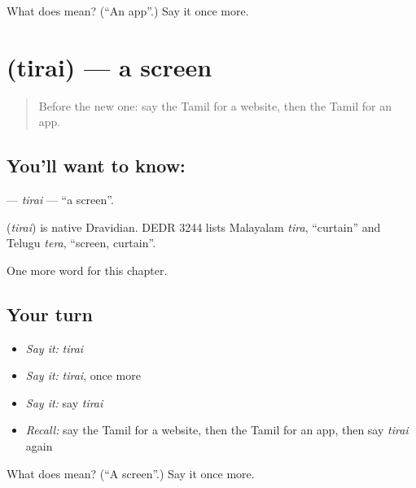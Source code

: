 \begin{tcolorbox}[breakable,colback=teal!4,colframe=teal!35!black,title={Before you move on}]
What does  mean? (\textquotedblleft{}An app\textquotedblright{}.) Say it once more.
\end{tcolorbox}
\section[\texorpdfstring{\ta{திரை} (tirai)}{திரை (tirai)}]{ (tirai) — a screen}

\label{lesson:TA-C189-tirai}



\begin{quote}
Before the new one: say the Tamil for a website, then the Tamil for an app.
\end{quote}

\subsection*{You'll want to know: }
\textbf{} — \emph{tirai} — \textquotedblleft{}a screen\textquotedblright{}.

\begin{cousinweb}
\textbf{} (\emph{tirai}) is native Dravidian. DEDR 3244 lists Malayalam \emph{tira}, \textquotedblleft{}curtain\textquotedblright{} and Telugu \emph{tera}, \textquotedblleft{}screen, curtain\textquotedblright{}.
\end{cousinweb}

\begin{grammarlens}[title={What you've built}]
One more word for this chapter.
\end{grammarlens}

\subsection*{Your turn}
\begin{itemize}
\raggedright
  \item \emph{Say it:} \emph{tirai}
  \item \emph{Say it:} \emph{tirai}, once more
  \item \emph{Say it:} say \emph{tirai}
  \item \emph{Recall:} say the Tamil for a website, then the Tamil for an app, then say \emph{tirai} again
\end{itemize}

\begin{tcolorbox}[breakable,colback=teal!4,colframe=teal!35!black,title={Before you move on}]
What does  mean? (\textquotedblleft{}A screen\textquotedblright{}.) Say it once more.
\end{tcolorbox}

